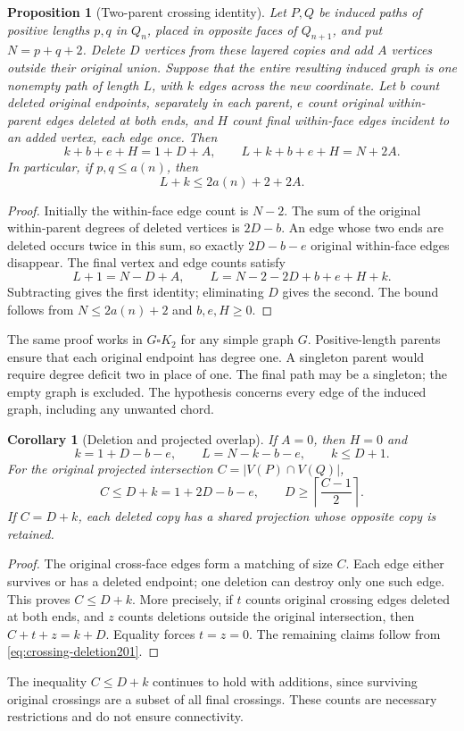 \documentclass[11pt,a4paper]{article}
\newtheorem{proposition}[theorem]{Proposition}
\newtheorem{corollary}[theorem]{Corollary}
\theoremstyle{definition}
\theoremstyle{remark}
\begin{document}
\begin{proposition}[Two-parent crossing identity]
\label{prop:crossing-deletion201}
Let $P,Q$ be induced paths of positive lengths $p,q$ in $Q_n$, placed
in opposite faces of $Q_{n+1}$, and put $N=p+q+2$.
Delete $D$ vertices from these layered copies and add $A$ vertices
outside their original union. Suppose that the entire resulting induced
graph is one nonempty path of length $L$, with $k$ edges across the
new coordinate. Let $b$ count deleted original endpoints, separately
in each parent, $e$ count original within-parent edges deleted at both
ends, and $H$ count final within-face edges incident to an added vertex,
each edge once. Then
\begin{equation}\label{eq:crossing-deletion201}
\boxed{k+b+e+H=1+D+A,\qquad L+k+b+e+H=N+2A.}
\end{equation}
In particular, if $p,q\le a(n)$, then
\begin{equation}\label{eq:crossing-bound201}
\boxed{L+k\le2a(n)+2+2A.}
\end{equation}
\end{proposition}
\begin{proof}
Initially the within-face edge count is $N-2$. The sum of the original
within-parent degrees of deleted vertices is $2D-b$. An edge whose two
ends are deleted occurs twice in this sum, so exactly $2D-b-e$ original
within-face edges disappear. The final vertex and edge counts satisfy
\[
L+1=N-D+A,\qquad L=N-2-2D+b+e+H+k.
\]
Subtracting gives the first identity; eliminating $D$ gives the second.
The bound follows from $N\le2a(n)+2$ and $b,e,H\ge0$.
\end{proof}
The same proof works in $G\square K_2$ for any simple graph $G$.
Positive-length parents ensure that each original endpoint has degree
one. A singleton parent would require degree deficit two in place of
one. The final path may be a singleton; the empty graph is excluded.
The hypothesis concerns every edge of the induced graph, including
any unwanted chord.

\begin{corollary}[Deletion and projected overlap]
\label{cor:overlap201}
If $A=0$, then $H=0$ and
\[
k=1+D-b-e,\qquad L=N-k-b-e,\qquad k\le D+1.
\]
For the original projected intersection $C=|V(P)\cap V(Q)|$,
\[
C\le D+k=1+2D-b-e,\qquad
D\ge\left\lceil\frac{C-1}{2}\right\rceil.
\]
If $C=D+k$, each deleted copy has a shared projection whose opposite
copy is retained.
\end{corollary}
\begin{proof}
The original cross-face edges form a matching of size $C$. Each edge
either survives or has a deleted endpoint; one deletion can destroy
only one such edge. This proves $C\le D+k$. More precisely, if $t$
counts original crossing edges deleted at both ends, and $z$ counts
deletions outside the original intersection, then $C+t+z=k+D$.
Equality forces $t=z=0$. The remaining claims follow from
\eqref{eq:crossing-deletion201}.
\end{proof}
The inequality $C\le D+k$ continues to hold with additions, since
surviving original crossings are a subset of all final crossings.
These counts are necessary restrictions and do not ensure connectivity.
\end{document}
